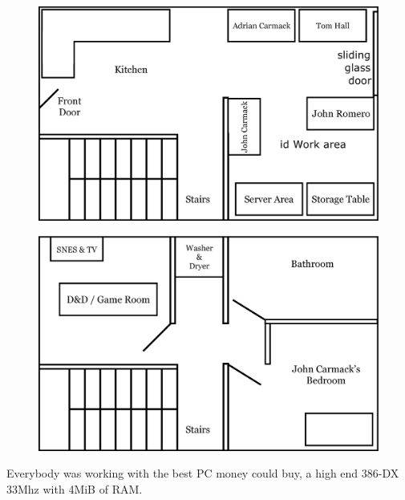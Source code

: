 \documentclass[book.tex]{subfiles}
\begin{document}
\par
\begin{figure}[H]
  \centering
  \includegraphics[width=\textwidth]{imgs/drawings/map/id-software-office-madison_bottom_floor.eps}
\end{figure}
\par
\begin{figure}[H]
  \centering
  \includegraphics[width=\textwidth]{imgs/drawings/map/id-software-office-madison_top_floor.eps}
\end{figure}

\pagebreak
Everybody was working with the best PC money could buy, a high end 386-DX 33Mhz with 4MiB of RAM.\\

 
\end{document}
